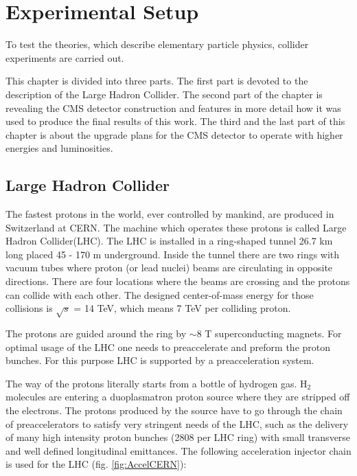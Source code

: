 \chapter{Experimental Setup}\label{chap:exp_setup}
To test the theories, which describe elementary particle physics, collider experiments are carried out. 

This chapter is divided into three parts.
The first part is devoted to the description of the Large Hadron Collider. The second part of the 
chapter is revealing the CMS detector construction and features in more detail how it was used to produce the final
results of this work. The third and the last part of this chapter is about the upgrade plans for the
CMS detector to operate with higher energies and luminosities.

\section{Large Hadron Collider}\label{sec:LHC}

The fastest protons in the world, ever controlled by mankind, are produced in Switzerland at CERN.
The machine which operates these protons is called Large Hadron Collider(LHC). 
The LHC is installed in a ring-shaped tunnel 26.7 km long  placed 45 - 170 m underground. 
Inside the tunnel there are two rings with vacuum tubes where proton (or lead nuclei) beams are circulating in opposite directions.
There are four locations where the beams are crossing and the protons can collide with each other. 
The designed center-of-mass energy for those collisions is $\sqrt{s}$ = 14 TeV, which means 7 TeV per colliding proton.

The protons are guided around the ring by $\sim$8 T superconducting magnets. 
For optimal usage of the LHC one needs to preaccelerate and preform the proton bunches.
For this purpose LHC is supported by a preacceleration system.


The way of the protons literally starts from a bottle of hydrogen gas.
H$_{2}$ molecules are entering a duoplasmatron proton source\cite{Scrivens:1382102} where they are stripped off the electrons. 
The protons produced by the source have to go through the chain of preaccelerators to satisfy very stringent needs of the LHC, such as 
the delivery of many high intensity proton bunches (2808 per LHC ring) with small transverse and well defined longitudinal emittances.
The following acceleration injector chain is used for the LHC (fig. \ref{fig:AccelCERN}): 

